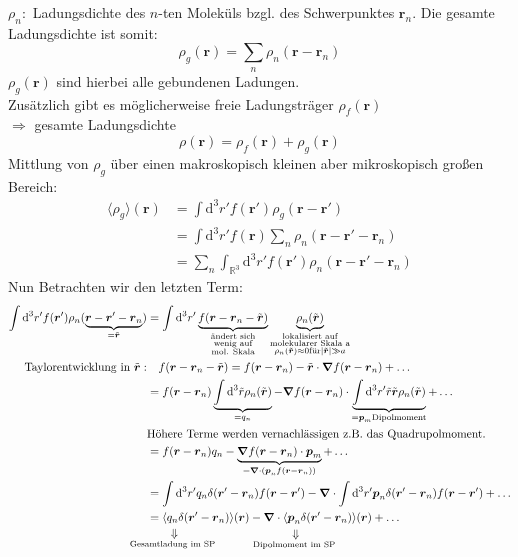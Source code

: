 \documentclass[titlepage,11pt,a4paper,ngerman]{report}
\newcommand{\tx}[1]{\textrm{#1}}
\newcommand{\ub}[1]{\underbrace{#1}}
\newcommand{\dd}{\tx{d}}
\newcommand{\custo}[3]{\underset{\scriptstyle\overset{\mkern4mu\rotatebox{-90}{$\,#1$}}{#3}}{#2}}
\renewcommand{\vec}[1]{\boldsymbol{#1}}
\newcommand{\vabla}{\boldsymbol{\nabla}}
\begin{document}
$ \rho_n : $ Ladungsdichte des $ n $-ten Moleküls bzgl. des Schwerpunktes $ \vec{r}_n $. Die gesamte Ladungsdichte ist somit:
\begin{equation*}
\rho_g(\vec{r}) = \sum_{n} \rho_n (\vec{r} - \vec{r}_n)
\end{equation*}
$ \rho_g (\vec{r}) $ sind hierbei alle gebundenen Ladungen.\\
Zusätzlich gibt es möglicherweise freie Ladungsträger $ \rho_f(\vec{r}) $\\
$ \Rightarrow $ gesamte Ladungsdichte
\begin{equation*}
\rho(\vec{r}) = \rho_f(\vec{r}) + \rho_g(\vec{r})
\end{equation*}
Mittlung von $ \rho_g $ über einen makroskopisch kleinen aber mikroskopisch großen Bereich:
\begin{align*}
\langle \rho_g \rangle (\vec{r}) &= \int \dd^3 r' f(\vec{r}') \rho_g (\vec{r} - \vec{r}') \\
&= \int \dd^3 r' f(\vec{r}) \sum_{n} \rho_n (\vec{r} - \vec{r}' - \vec{r}_n) \\
&= \sum_{n} \int_{\mathbb{R}^3} \dd^3 r' f(\vec{r}') \rho_n (\vec{r} - \vec{r}' - \vec{r}_n)
\end{align*}
Nun Betrachten wir den letzten Term:
\begin{align*}
\int \dd^3 r' f(\vec{r}') \rho_n (\ub{\vec{r} - \vec{r}' - \vec{r}_n}_{= \tilde{\vec{r}}}) &= \int \dd ^3 r' \ub{f(\vec{r} - \vec{r}_n - \tilde{\vec{r}})}_{\substack{\tx{ändert sich} \\ \tx{wenig auf} \\ \tx{mol. Skala}}} \ub{\rho_n(\tilde{\vec{r}})}_{\substack{\tx{lokalisiert auf} \\ \tx{molekularer Skala a} \\ \rho_n(\tilde{\vec{r}})\approx 0 \tx{für} |\tilde{\vec{r}}| \gg a }}\\
\tx{Taylorentwicklung in } \tilde{\vec{r}}: &\quad f(\vec{r} - \vec{r}_n - \tilde{\vec{r}}) = f(\vec{r} - \vec{r}_n) - \tilde{\vec{r}} \cdot \vabla f(\vec{r} - \vec{r}_n) + \dots \\
&= f(\vec{r} - \vec{r}_n) \ub{\int \dd^3 \tilde{r} \rho_n(\tilde{\vec{r}})}_{= q_n} - \vabla f(\vec{r} - \vec{r}_n) \cdot \ub{\int \dd ^3 r' \tilde{r} \tilde{\vec{r}} \rho_n(\tilde{\vec{r}})}_{= \vec{p}_m \tx{Dipolmoment}} + \dots \\
& \tx{Höhere Terme werden vernachlässigen z.B. das Quadrupolmoment.} \\
&= f(\vec{r} - \vec{r}_n) q_n - \ub{\vabla f(\vec{r} - \vec{r}_n) \cdot \vec{p}_m}_{= \vabla \cdot (\vec{p}_n f(\vec{r} - \vec{r}_n))} + \dots \\
&= \int \dd^3r' q_n \delta(\vec{r}' - \vec{r}_n) f(\vec{r} - \vec{r}') - \vabla \cdot \int \dd^3r' \vec{p}_n \delta(\vec{r}' - \vec{r}_n) f(\vec{r} - \vec{r}') + \dots \\
&= \langle \custo{\Rightarrow}{q_n}{\mathclap{\tx{Gesamtladung im SP}}} \delta(\vec{r}' - \vec{r}_n) \rangle (\vec{r}) - \vabla \cdot \langle \custo{\Rightarrow}{\vec{p}_n}{\mathclap{\tx{Dipolmoment im SP}}} \delta(\vec{r}' - \vec{r}_n) \rangle (\vec{r}) + \dots
\end{align*}
\end{document}
